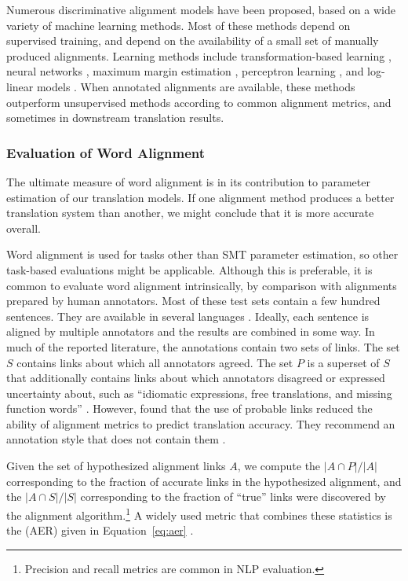Numerous discriminative alignment models have been 
proposed, based on a wide variety of machine learning
methods.  Most of these methods depend on supervised
training, and depend on the availability
of a small set of manually produced alignments.
Learning methods include
transformation-based learning \citep{Ayan:2005:hlt:tbl},
neural networks \citep{Ayan:2005:hlt:neuralign},
maximum margin estimation \citep{Taskar:2005:hlt},
perceptron learning \citep{Moore:2005:hlt},
and log-linear models \citep{Ittycheriah:2005:hlt-emnlp,Fraser:2006:acl-coling}.
When annotated alignments are available, these
methods outperform unsupervised methods according to common
alignment metrics, and sometimes in downstream
translation results.

\subsubsection{Evaluation of Word Alignment}\label{sec:evaluation-of-word-alignment}

The ultimate measure of word alignment is 
in its contribution to parameter estimation of our
translation models.  If one alignment method produces
a better translation system than another, 
we might conclude that it
is more accurate overall.

Word alignment is used 
for tasks other than SMT parameter estimation, 
so other task-based evaluations might be applicable.  
Although this is preferable, it is common to
evaluate word alignment intrinsically, by comparison 
with alignments prepared by human annotators.  
Most of these test sets contain a few hundred sentences.
They are available in several languages
\citep{Melamed:1998:tr-bp,Och:2000:coling,Mihalcea:2003:wpt}.
Ideally, each sentence is aligned by multiple annotators
and the results are combined in some way.
In much of the reported literature, the annotations contain two sets 
of links.  The  set $S$
contains links about which all annotators agreed.
The  set $P$ is a superset of $S$ that additionally contains links
about which annotators disagreed or expressed uncertainty about, such as ``idiomatic
expressions, free translations, and missing function words'' \citep{Och:2000:coling}.
However, \citet{Fraser:2007:cl} found that the use of probable 
links reduced the ability of alignment metrics to 
predict translation accuracy.  They
recommend an annotation style that does not contain
them \citep{Melamed:1998:tr-bp}.

Given the set of hypothesized alignment links $A$, 
we compute the  
$|A \cap P|/|A|$ corresponding to the fraction of accurate
links in the hypothesized alignment, and the 
$|A \cap S|/|S|$ corresponding to the fraction of 
``true'' links were discovered by the alignment 
algorithm.\footnote{Precision and recall metrics are common
in NLP evaluation.}  A widely used metric that combines
these statistics is the  (AER) given in Equation~\ref{eq:aer} \citep{Och:2000:coling}.


